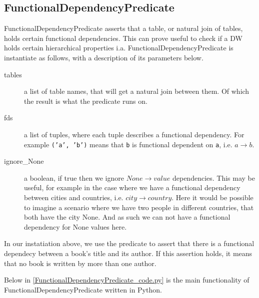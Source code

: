 \subsection{FunctionalDependencyPredicate}
FunctionalDependencyPredicate asserts that a table, or natural join of tables, holds certain functional dependencies. This can prove useful to check if a DW holds certain hierarchical properties i.a. FunctionalDependencyPredicate is instantiate as follows, with a description of its parameters below.


\begin{description}
\item [tables] a list of table names, that will get a natural join between them. Of which the result is what the predicate runs on. 
\item [fds] a list of tuples, where each tuple describes a functional dependency. For example \texttt{('a', 'b')} means that \texttt{b} is functional dependent on \texttt{a}, i.e. $a \rightarrow b$.
\item [ignore\_None] a boolean, if true then we ignore $None \rightarrow value$ dependencies. This may be useful, for example in the case where we have a functional dependency between cities and countries, i.e. $city \rightarrow country$. Here it would be possible to imagine a scenario where we have two people in different countries, that both have the city None. And as such we can not have a functional dependency for None values here.
  
\end{description}

In our instatiation above, we use the predicate to assert that there is a functional dependecy between a book's title and its author. If this assertion holds, it means that no book is written by more than one author. 

Below in \cref{FunctionalDependencyPredicate_code.py} is the main functionality of FunctionalDependencyPredicate written in Python.


